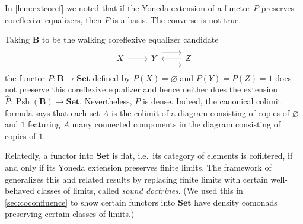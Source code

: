 \documentclass[11pt, oneside, article]{memoir}
\theoremstyle{plain}
\theoremstyle{definition}
\theoremstyle{remark}
\newenvironment{counterexample}
{\renewcommand\qedsymbol{$\lrcorner$}%
  \pushQED{\qed}\mycounterexample}
{\popQED\endmycounterexample}
\DeclareMathOperator{\Psh}{Psh}
\newcommand{\namedcat}[1]{\mathbf{#1}}
\newcommand{\cat}[1]{\mathbf{#1}}
\newcommand{\Set}{\namedcat{Set}}
\newcommand{\extend}[1]{\widehat{#1}}
\newcommand{\ph}[1]{#1}
\newcommand{\Ps}[1]{\Psh(#1)}
\newcommand{\xA}{A}
\newcommand{\xX}{X}
\newcommand{\xY}{Y}
\newcommand{\xZ}{Z}
\newcommand{\bB}{\cat{B}}
\newcommand{\pP}{\ph{P}}
\begin{document}
In \cref{lem:extcoref} we noted that if the Yoneda extension of a
functor $\pP$ preserves coreflexive equalizers, then $\pP$ is a
basis. The converse is not true.

\begin{counterexample}[Non-basis-like basis]\label{cex:extcoref}
  Taking $\bB$ to be the walking coreflexive equalizer candidate
  \[\begin{tikzcd}
      \xX & \xY & \xZ
      \arrow[from=1-1, to=1-2]
      \arrow[shift left=3, from=1-2, to=1-3]
      \arrow[shift right=3, from=1-2, to=1-3]
      \arrow[from=1-3, to=1-2]
    \end{tikzcd}\] the functor $\pP \colon \bB \to \Set$ defined by
  $\pP(\xX) = \varnothing$ and $\pP(\xY) = \pP(\xZ) = 1$ does not
  preserve this coreflexive equalizer and hence neither does the
  extension $\extend{\pP} \colon \Ps{\bB} \to \Set$. Nevertheless,
  $\pP$ is dense. Indeed, the canonical colimit formula says that each
  set $\xA$ is the colimit of a diagram consisting of copies of
  $\varnothing$ and $1$ featuring $\xA$ many connected components
  in the diagram consisting of copies of $1$.
\end{counterexample}

Relatedly, a functor into $\Set$ is flat, i.e.\ its category of
elements is cofiltered, if and only if its Yoneda extension preserves
finite limits. The framework of~\cite{adamek-borceux-lack-rosicky}
generalizes this and related results by replacing finite limits with
certain well-behaved classes of limits, called \emph{sound
  doctrines}. (We used this in \cref{sec:coconfluence} to show certain
functors into $\Set$ have density comonads preserving certain classes
of limits.)
\end{document}
